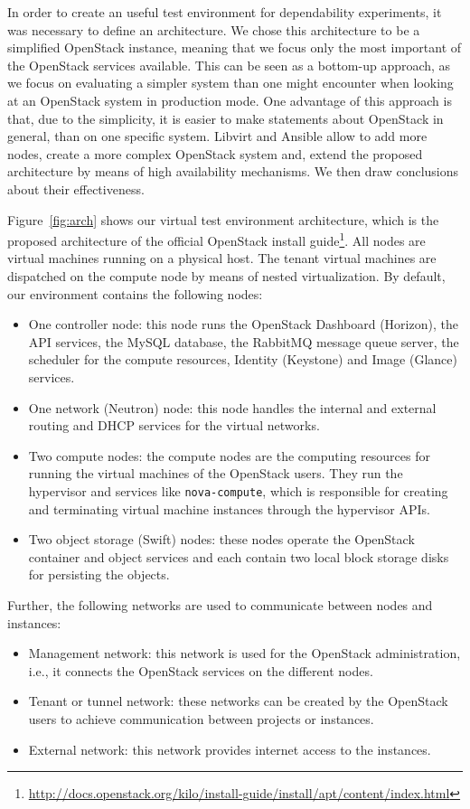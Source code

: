 In order to create an useful test environment for dependability experiments, it was necessary to define an architecture. We chose this architecture to be a simplified OpenStack instance, meaning that we focus only the most important of the OpenStack services available. This can be seen as a bottom-up approach, as we focus on evaluating a simpler system than one might encounter when looking at an OpenStack system in production mode. One advantage of this approach is that, due to the simplicity, it is easier to make statements about OpenStack in general, than on one specific system. Libvirt and Ansible allow to add more nodes, create a more complex OpenStack system and, extend the proposed architecture by means of high availability mechanisms. We then draw conclusions about their effectiveness.

Figure~\ref{fig:arch} shows our virtual test environment architecture, which is the proposed architecture of the official OpenStack install guide\footnote{\url{http://docs.openstack.org/kilo/install-guide/install/apt/content/index.html}}. All nodes are virtual machines running on a physical host. The tenant virtual machines are dispatched on the compute node by means of nested virtualization. By default, our environment contains the following nodes:
\begin{itemize}
	\item One controller node: this node runs the OpenStack Dashboard (Horizon), the API services, the MySQL database, the RabbitMQ message queue server, the scheduler for the compute resources, Identity (Keystone) and Image (Glance) services.
	\item One network (Neutron) node: this node handles the internal and external routing and DHCP services for the virtual networks.
	\item Two compute nodes: the compute nodes are the computing resources for running the virtual machines of the OpenStack users. They run the hypervisor and services like \verb|nova-compute|, which is responsible for creating and terminating virtual machine instances through the hypervisor APIs.
	\item Two object storage (Swift) nodes: these nodes operate the OpenStack container and object services and each contain two local block storage disks for persisting the objects.
\end{itemize}

Further, the following networks are used to communicate between nodes and instances:
\begin{itemize}
	\item Management network: this network is used for the OpenStack administration, i.e., it connects the OpenStack services on the different nodes. 
	\item Tenant or tunnel network: these networks can be created by the OpenStack users to achieve communication between projects or instances. 
	\item External network: this network provides internet access to the instances.
\end{itemize}

